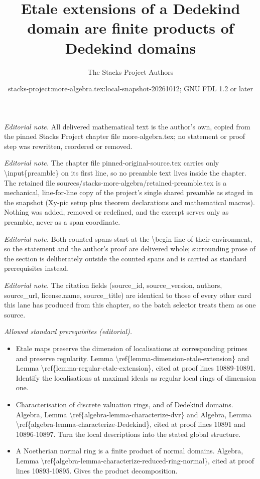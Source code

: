 \documentclass[10pt,a4paper]{amsart}
\title{Etale extensions of a Dedekind domain are finite products of Dedekind domains}
\author{The Stacks Project Authors}
\date{stacks-project:more-algebra.tex:local-snapshot-20261012; GNU FDL 1.2 or later}
\theoremstyle{plain}
\theoremstyle{definition}
\theoremstyle{remark}
\numberwithin{equation}{subsection}
\begin{document}
\maketitle
\setcounter{subsection}{1}
\noindent\textit{Editorial note.} All delivered mathematical text is the author's own, copied from the pinned Stacks Project chapter file more-algebra.tex; no statement or proof step was rewritten, reordered or removed.\par\medskip
\noindent\textit{Editorial note.} The chapter file pinned-original-source.tex carries only \textbackslash{}input\{preamble\} on its first line, so no preamble text lives inside the chapter. The retained file sources/stacks-more-algebra/retained-preamble.tex is a mechanical, line-for-line copy of the project's single shared preamble as staged in the snapshot (Xy-pic setup plus theorem declarations and mathematical macros). Nothing was added, removed or redefined, and the excerpt serves only as preamble, never as a span coordinate.\par\medskip
\noindent\textit{Editorial note.} Both counted spans start at the \textbackslash{}begin line of their environment, so the statement and the author's proof are delivered whole; surrounding prose of the section is deliberately outside the counted spans and is carried as standard prerequisites instead.\par\medskip
\noindent\textit{Editorial note.} The citation fields (source\_id, source\_version, authors, source\_url, license.name, source\_title) are identical to those of every other card this lane has produced from this chapter, so the batch selector treats them as one source.\par\medskip
\noindent\textit{Allowed standard prerequisites (editorial).}\begin{itemize}
\item Etale maps preserve the dimension of localisations at corresponding primes and preserve regularity. Lemma \textbackslash{}ref\{lemma-dimension-etale-extension\} and Lemma \textbackslash{}ref\{lemma-regular-etale-extension\}, cited at proof lines 10889-10891. Identify the localisations at maximal ideals as regular local rings of dimension one.
\item Characterisation of discrete valuation rings, and of Dedekind domains. Algebra, Lemma \textbackslash{}ref\{algebra-lemma-characterize-dvr\} and Algebra, Lemma \textbackslash{}ref\{algebra-lemma-characterize-Dedekind\}, cited at proof lines 10891 and 10896-10897. Turn the local descriptions into the stated global structure.
\item A Noetherian normal ring is a finite product of normal domains. Algebra, Lemma \textbackslash{}ref\{algebra-lemma-characterize-reduced-ring-normal\}, cited at proof lines 10893-10895. Gives the product decomposition.
\end{itemize}\medskip
\end{document}
